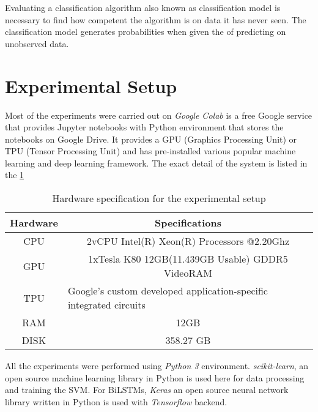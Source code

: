 \label{ch:evaluation}

Evaluating a classification algorithm also known as classification model is necessary to find how competent the algorithm is on data it has never seen. The classification model generates probabilities when given the of predicting on unobserved data. 

\section{Experimental Setup}
Most of the experiments were carried out on \textit{Google Colab} is a free Google service that provides Jupyter notebooks with Python environment that stores the notebooks on Google Drive. It provides a GPU (Graphics Processing Unit) or TPU (Tensor Processing Unit) and has pre-installed various popular machine learning and deep learning framework. The exact detail of the system is listed in the \ref{table:HWsetup}

\begin{table}[!ht]
\centering
\begin{tabular}{cc}
\hline
\textbf{Hardware} & \textbf{Specifications} \\ \hline
CPU & 2vCPU Intel(R) Xeon(R) Processors @2.20Ghz \\
GPU & 1xTesla K80 12GB(11.439GB Usable) GDDR5  VideoRAM \\
TPU & \multicolumn{1}{l}{Google's custom developed application-specific integrated circuits} \\
RAM & 12GB \\
DISK & 358.27 GB \\ \hline
\end{tabular}
\captionsetup{justification=justified,margin=1cm}
\caption{Hardware specification for the experimental setup}
\label{table:HWsetup}
\end{table}

All the experiments were performed using \textit{Python 3} environment. \textit{scikit-learn}, an open source machine learning library in Python is used here for data processing and training the SVM. For \glspl{BiLSTM}, \textit{Keras} an open source neural network library written in Python is used with \textit{Tensorflow} backend.  

